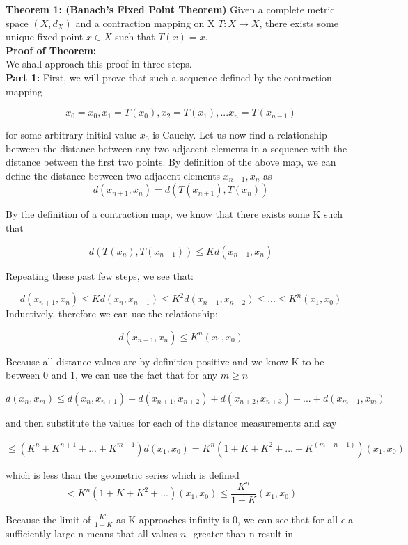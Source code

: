 \documentclass{article}
\begin{document}
\textbf{Theorem 1: (Banach's Fixed Point Theorem)} Given a complete metric space $(X, d_X)$ and a contraction mapping on X $T: X \to X$, there exists some unique fixed point $x \in X$ such that $T(x) = x$. \\

\textbf{Proof of Theorem:} \\
We shall approach this proof in three steps. \\
\textbf{Part 1: }First, we will prove that such a sequence defined by the contraction mapping

$$x_0 = x_0, x_1 = T(x_0), x_2 = T(x_1), ... x_n = T(x_{n-1})$$

for some arbitrary initial value $x_0$ is Cauchy. 
Let us now find a relationship between the distance between any two adjacent elements in a sequence with the distance between the first two points. By definition of the above map, we can define the distance between two adjacent elements $x_{n+1}, x_{n}$ as
$$d(x_{n+1} , x_{n}) = d(T(x_{n+1}) , T(x_{n}))$$

By the definition of a contraction map, we know that there exists some K such that

$$d(T(x_{n}) , T(x_{n-1})) \leq Kd(x_{n+1}, x_{n}) $$

Repeating these past few steps, we see that:

$$d(x_{n+1} , x_{n}) \leq Kd(x_{n}, x_{n-1}) \leq K^2d(x_{n-1}, x_{n-2}) \leq ... \leq  K^{n}(x_{1}, x_{0}) $$
Inductively, therefore we can use the relationship:

$$d(x_{n+1} , x_{n}) \leq K^{n}(x_{1}, x_{0}) $$

Because all distance values are by definition positive and we know K to be between 0 and 1, we can use the fact that for any $m \geq n$

$$d(x_{n} , x_{m}) \leq d(x_n, x_{n+1}) + d(x_{n+1}, x_{n+2}) + d(x_{n+2}, x_{n+3}) +  ... + d(x_{m-1}, x_{m})$$

and then substitute the values for each of the distance measurements and say

$$ \leq (K^n + K^{n+1} + ... + K^{m-1})d(x_1, x_0) = K^n(1+ K + K^2 + ... + K^(m-n-1))(x_1, x_0)$$

which is less than the geometric series which is defined
$$ < K^n(1+ K + K^2 + ... )(x_1, x_0) \leq \frac{K^n}{1-K}(x_1, x_0)$$

Because the limit of $\frac{K^n}{1-K}$ as K approaches infinity is 0, we can see that for all $\epsilon$ a sufficiently large n means that all values $n_0$ greater than n result in 
\end{document}
